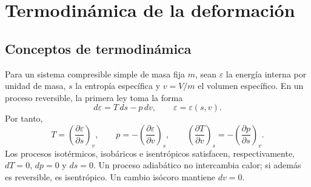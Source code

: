 \section{Termodinámica de la deformación}

\subsection{Conceptos de termodinámica}

Para un sistema compresible simple de masa fija $m$, sean $\varepsilon$ la energía interna por unidad de masa, $s$ la entropía específica y $v=V/m$ el volumen específico. En un proceso reversible, la primera ley toma la forma
\[
d\varepsilon=T\,ds-p\,dv,
\qquad \varepsilon=\varepsilon(s,v).
\]
Por tanto,
\[
T=\left(\frac{\partial\varepsilon}{\partial s}\right)_v,
\qquad p=-\left(\frac{\partial\varepsilon}{\partial v}\right)_s,
\qquad
\left(\frac{\partial T}{\partial v}\right)_s
=-\left(\frac{\partial p}{\partial s}\right)_v.
\]
Los procesos isotérmicos, isobáricos e isentrópicos satisfacen, respectivamente, $dT=0$, $dp=0$ y $ds=0$. Un proceso adiabático no intercambia calor; si además es reversible, es isentrópico. Un cambio isócoro mantiene $dv=0$.

